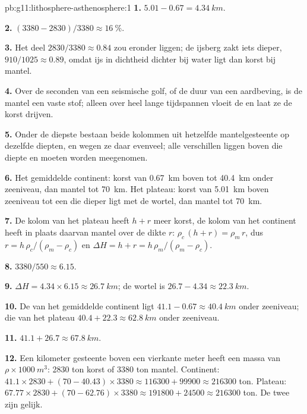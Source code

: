 \begin{solution}{pb:g11:lithosphere-asthenosphere:1}
\textbf{1.} $5.01 - 0.67 = \qty{4.34}{km}$.

\textbf{2.} $(3380 - 2830)/3380 \approx \qty{16}{\percent}$.

\textbf{3.} Het deel $2830/3380 \approx 0.84$ zou eronder liggen; de
ijsberg zakt iets dieper, $910/1025 \approx 0.89$, omdat ijs in dichtheid dichter
bij water ligt dan korst bij mantel.

\textbf{4.} Over de seconden van een seismische golf, of de duur van een
aardbeving, is de mantel een vaste stof; alleen over heel lange tijdspannen
vloeit de  en laat ze de korst drijven.

\textbf{5.} Onder de diepste  bestaan beide kolommen uit hetzelfde
mantelgesteente op dezelfde diepten, en wegen ze daar evenveel; alle verschillen
liggen boven die diepte en moeten worden meegenomen.

\textbf{6.} Het gemiddelde continent: korst van \qty{0.67}{km} boven tot
\qty{40.4}{km} onder zeeniveau, dan mantel tot \qty{70}{km}. Het
plateau: korst van \qty{5.01}{km} boven zeeniveau tot een  die dieper ligt
met de wortel, dan mantel tot \qty{70}{km}.

\textbf{7.} De kolom van het plateau heeft $h + r$ meer korst, de kolom van het
continent heeft in plaats daarvan mantel over de dikte $r$: $\rho_c\,(h + r) = \rho_m\,r$,
dus $r = h\,\rho_c/(\rho_m - \rho_c)$ en $\Delta H = h + r =
h\,\rho_m/(\rho_m - \rho_c)$.

\textbf{8.} $3380/550 \approx 6.15$.

\textbf{9.} $\Delta H = 4.34 \times 6.15 \approx \qty{26.7}{km}$; de wortel is
$26.7 - 4.34 \approx \qty{22.3}{km}$.

\textbf{10.} De  van het gemiddelde continent ligt $41.1 - 0.67 \approx
\qty{40.4}{km}$ onder zeeniveau; die van het plateau $40.4 + 22.3 \approx
\qty{62.8}{km}$ onder zeeniveau.

\textbf{11.} $41.1 + 26.7 \approx \qty{67.8}{km}$.

\textbf{12.} Een kilometer gesteente boven een vierkante meter heeft een massa van
$\rho \times \qty{1000}{m^3}$: \num{2830} ton korst of \num{3380}
ton mantel. Continent: $41.1 \times 2830 + (70 - 40.43) \times 3380
\approx \num{116300} + \num{99900} \approx \num{216300}$ ton. Plateau:
$67.77 \times 2830 + (70 - 62.76) \times 3380 \approx \num{191800} +
\num{24500} \approx \num{216300}$ ton. De twee zijn gelijk.


\end{solution}
